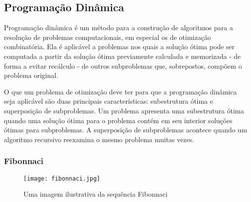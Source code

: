 
  \subsection{Programação Dinâmica}

    Programação dinâmica é um método para a construção de algoritmos para a resolução
    de problemas computacionais, em especial os de otimização combinatória.
    Ela é aplicável a problemas nos quais a solução ótima pode ser computada a 
    partir da solução ótima previamente calculada e memorizada - de forma a evitar recálculo - 
    de outros subproblemas que, sobrepostos, compõem o problema original.

    O que um problema de otimização deve ter para que a programação dinâmica 
    seja aplicável são duas principais características: subestrutura ótima e 
    superposição de subproblemas. Um problema apresenta uma subestrutura ótima 
    quando uma solução ótima para o problema contém em seu interior soluções 
    ótimas para subproblemas. A superposição de subproblemas acontece quando 
    um algoritmo recursivo reexamina o mesmo problema muitas vezes. 

    \subsubsection{Fibonnaci}

    \begin{figure}[ht]
      \centering
      \texttt{[image: fibonnaci.jpg]}
      \caption{Uma imagem ilustrativa da sequência Fibonnaci}
      \label{fig:fibonnaci}
    \end{figure}
